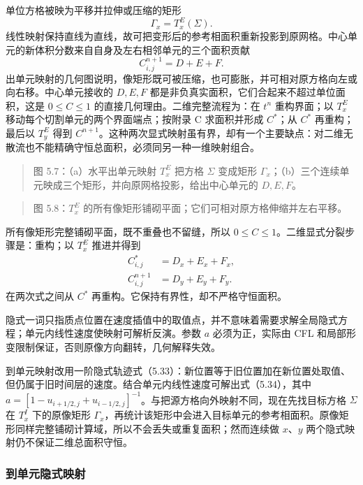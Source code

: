 \documentclass[11pt,a4paper,openany,fontset=none]{ctexbook}
\begin{document}
单位方格被映为平移并拉伸或压缩的矩形
\begin{equation}
\Gamma_x=T_x^E(\Sigma).
\tag{5.29}
\end{equation}
线性映射保持直线为直线，故可把变形后的参考相面积重新投影到原网格。中心单元的新体积分数来自自身及左右相邻单元的三个面积贡献
\begin{equation}
C_{i,j}^{n+1}=D+E+F.
\tag{5.30}
\end{equation}
出单元映射的几何图说明，像矩形既可被压缩，也可膨胀，并可相对原方格向左或向右移。中心单元接收的 $D,E,F$ 都是非负真实面积，它们合起来不超过单位面积，这是 $0\le C\le1$ 的直接几何理由。二维完整流程为：在 $t^n$ 重构界面；以 $T_x^E$ 移动每个切割单元的两个界面端点；按附录 C 求面积并形成 $C^*$；从 $C^*$ 再重构；最后以 $T_y^E$ 得到 $C^{n+1}$。这种两次显式映射虽有界，却有一个主要缺点：对二维无散流也不能精确守恒总面积，必须同另一种一维映射组合。

\begin{quote}\small 图 5.7：（a）水平出单元映射 $T_x^E$ 把方格 $\Sigma$ 变成矩形 $\Gamma_x$；（b）三个连续单元映成三个矩形，并向原网格投影，给出中心单元的 $D,E,F$。\end{quote}

\begin{quote}\small 图 5.8：$T_x^E$ 的所有像矩形铺砌平面；它们可相对原方格伸缩并左右平移。\end{quote}
所有像矩形完整铺砌平面，既不重叠也不留缝，所以 $0\leq C\leq1$。二维显式分裂步骤是：重构；以 $T_x^E$ 推进并得到
\begin{align}
C^*_{i,j}&=D_x+E_x+F_x,\tag{5.31}\\
C^{n+1}_{i,j}&=D_y+E_y+F_y.\tag{5.32}
\end{align}
在两次式之间从 $C^*$ 再重构。它保持有界性，却不严格守恒面积。

隐式一词只指质点位置在速度插值中的取值点，并不意味着需要求解全局隐式方程；单元内线性速度使映射可解析反演。参数 $a$ 必须为正，实际由 CFL 和局部形变限制保证，否则原像方向翻转，几何解释失效。

到单元映射改用一阶隐式轨迹式（5.33）：新位置等于旧位置加在新位置处取值、但仍属于旧时间层的速度。结合单元内线性速度可解出式（5.34），其中 $a=[1-u_{i+1/2,j}+u_{i-1/2,j}]^{-1}$。与把源方格向外映射不同，现在先找目标方格 $\Sigma$ 在 $T_x^I$ 下的原像矩形 $\Gamma_x$，再统计该矩形中会进入目标单元的参考相面积。原像矩形同样完整铺砌计算域，所以不会丢失或重复面积；然而连续做 $x$、$y$ 两个隐式映射仍不保证二维总面积守恒。

\subsubsection{到单元隐式映射}
\end{document}
